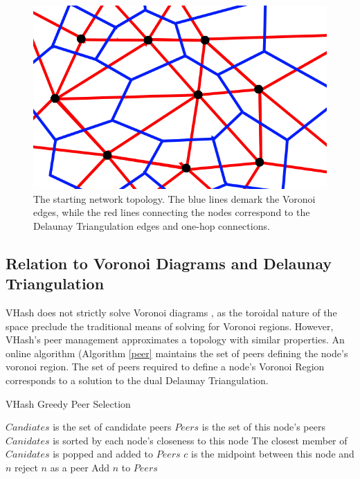 \documentclass[11pt]{IEEEtran} %
\begin{document}
\begin{figure}
    \includegraphics[width=\linewidth]{voronoi-churn2}
    \caption{The starting network topology.  The blue lines demark the Voronoi edges, while the red lines connecting the nodes correspond to the Delaunay Triangulation edges and one-hop connections.}
    \label{churninit}
\end{figure}

\subsection{Relation to Voronoi Diagrams and Delaunay Triangulation}

VHash does not strictly solve Voronoi diagrams \cite{voronoi}, as the toroidal nature of the space preclude the traditional means of solving for Voronoi regions. However, VHash's peer management approximates a topology with similar properties. 
An online algorithm (Algorithm \ref{peer} maintains the set of peers defining the node's voronoi region. The set of peers required to define a node's Voronoi Region corresponds to a solution to the dual Delaunay Triangulation.



\begin{algorithm}
\caption{VHash Greedy Peer Selection}
\label{peer}
\begin{algorithmic}[1]  %
	\STATE $Candiates$ is the set of candidate peers
    \STATE $Peers$ is the set of this node's peers
    \STATE $Canidates$ is sorted by each node's closeness to this node
    \STATE The closest member of $Canidates$ is popped and added to $Peers$
    	\STATE $c$ is the midpoint between this node and $n$
        	\STATE reject $n$ as a peer
        \ELSE
        	\STATE Add $n$ to $Peers$
        \ENDIF
    \ENDFOR
\end{algorithmic}
\end{algorithm}
\end{document}
